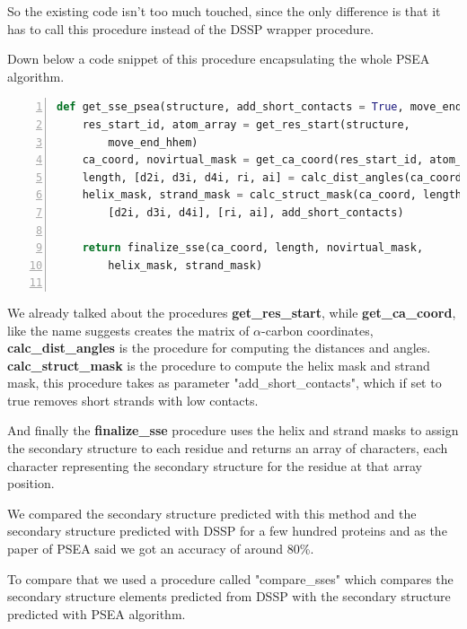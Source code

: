 So the existing code isn't too much touched, since the only difference is that it has to call this procedure instead of the DSSP wrapper procedure.

Down below a code snippet of this procedure encapsulating the whole PSEA algorithm.

\begin{lstlisting}[language=Python, caption=Procedure get\_sse\_psea(), numbers=left]
def get_sse_psea(structure, add_short_contacts = True, move_end_hhem = True) :
    res_start_id, atom_array = get_res_start(structure, 
        move_end_hhem)
    ca_coord, novirtual_mask = get_ca_coord(res_start_id, atom_array)
    length, [d2i, d3i, d4i, ri, ai] = calc_dist_angles(ca_coord)
    helix_mask, strand_mask = calc_struct_mask(ca_coord, length, 
        [d2i, d3i, d4i], [ri, ai], add_short_contacts)
    
    return finalize_sse(ca_coord, length, novirtual_mask, 
        helix_mask, strand_mask)
        
\end{lstlisting}

We already talked about the procedures \textbf{get\_res\_start}, while \textbf{get\_ca\_coord}, like the name suggests creates the matrix of $\alpha$-carbon coordinates, \textbf{calc\_dist\_angles} is the procedure for computing the distances and angles. \textbf{calc\_struct\_mask} is the procedure to compute the helix mask and strand mask, this procedure takes as parameter "add\_short\_contacts", which if set to true removes short strands with low contacts.

And finally the \textbf{finalize\_sse} procedure uses the helix and strand masks to assign the secondary structure to each residue and returns an array of characters, each character representing the secondary structure for the residue at that array position.

We compared the secondary structure predicted with this method and the secondary structure predicted with DSSP for a few hundred proteins and as the paper\cite{psea} of PSEA said we got an accuracy of around 80\%. 

To compare that we used a procedure called "compare\_sses" which compares the secondary structure elements predicted from DSSP with the secondary structure predicted with PSEA algorithm.

